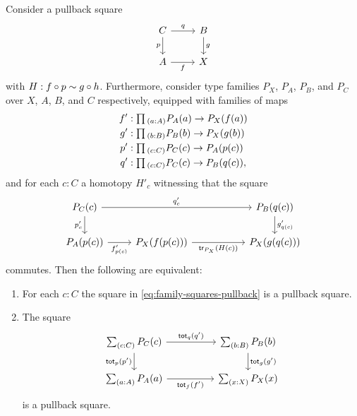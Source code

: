 \begin{lem}\label{lem:fiberwise-pullback}
Consider a pullback square
  \begin{equation*}
    \begin{tikzcd}
      C \arrow[r,"q"] \arrow[d,swap,"p"] & B \arrow[d,"g"] \\
      A \arrow[r,swap,"f"] & X
    \end{tikzcd}
  \end{equation*}
  with $H : f \circ p \sim g \circ h$. Furthermore, consider type families $P_X$, $P_A$, $P_B$, and $P_C$ over $X$, $A$, $B$, and $C$ respectively, equipped with families of maps
  \begin{align*}
    f' & : \prd{a:A} P_A(a) \to P_X(f(a)) \\
    g' & : \prd{b:B} P_B(b) \to P_X(g(b)) \\
    p' & : \prd{c:C} P_C(c) \to P_A(p(c)) \\
    q' & : \prd{c:C} P_C(c) \to P_B(q(c)),
  \end{align*}
  and for each $c:C$ a homotopy $H'_c$ witnessing that the square
  \begin{equation}\label{eq:family-squares-pullback}
    \begin{tikzcd}
      P_C(c) \arrow[rr,"{q'_c}"] \arrow[d,swap,"{p'_c}"] & &[3em] P_B(q(c)) \arrow[d,"{g'_{q(c)}}"] \\
      P_A(p(c)) \arrow[r,swap,"{f'_{p(c)}}"] & P_X(f(p(c))) \arrow[r,swap,"{\tr_{P_X}(H(c))}"] & P_X(g(q(c)))
    \end{tikzcd}
  \end{equation}
  commutes. Then the following are equivalent:
  \begin{enumerate}
  \item For each $c:C$ the square in \cref{eq:family-squares-pullback} is a pullback square.
  \item The square
    \begin{equation}\label{eq:total-square-pullback}
      \begin{tikzcd}[column sep=huge]
        \sm{c:C}P_C(c)
        \arrow[r,"{\tot[q]{q'}}"] \arrow[d,swap,"{\tot[p]{p'}}"] &
        \sm{b:B}P_B(b) \arrow[d,"{\tot[g]{g'}}"] \\
        \sm{a:A}P_A(a) \arrow[r,swap,"{\tot[f]{f'}}"] & \sm{x:X}P_X(x)
      \end{tikzcd}
    \end{equation}
    is a pullback square.
  \end{enumerate}
\end{lem}


